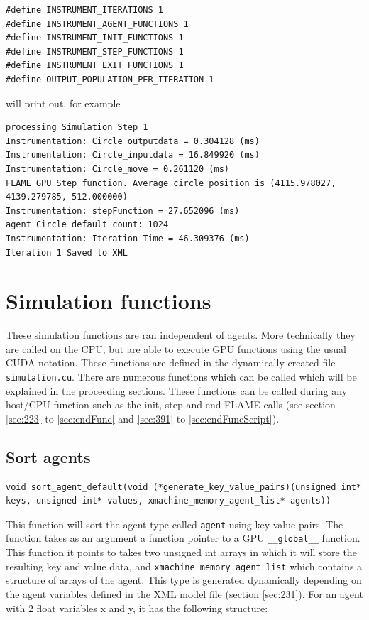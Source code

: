 \documentclass[11pt, a4paper, onecolumn, oneside]{report}
\begin{document}
\begin{verbatim}
#define INSTRUMENT_ITERATIONS 1
#define INSTRUMENT_AGENT_FUNCTIONS 1
#define INSTRUMENT_INIT_FUNCTIONS 1
#define INSTRUMENT_STEP_FUNCTIONS 1
#define INSTRUMENT_EXIT_FUNCTIONS 1
#define OUTPUT_POPULATION_PER_ITERATION 1
\end{verbatim}

will print out, for example
\begin{verbatim}
processing Simulation Step 1
Instrumentation: Circle_outputdata = 0.304128 (ms)
Instrumentation: Circle_inputdata = 16.849920 (ms)
Instrumentation: Circle_move = 0.261120 (ms)
FLAME GPU Step function. Average circle position is (4115.978027, 4139.279785, 512.000000)
Instrumentation: stepFunction = 27.652096 (ms)
agent_Circle_default_count: 1024
Instrumentation: Iteration Time = 46.309376 (ms)
Iteration 1 Saved to XML
\end{verbatim}

\section{Simulation functions}

These simulation functions are ran independent of agents. More technically they are called on the CPU, but are able to execute GPU functions using the usual CUDA notation. These functions are defined in the dynamically created file \texttt{simulation.cu}. There are numerous functions which can be called which will be explained in the proceeding sections. These functions can be called during any host/CPU function such as the init, step and end FLAME calls (see section \ref{sec:223} to \ref{sec:endFunc} and \ref{sec:391} to \ref{sec:endFuncScript}).

\subsection{Sort agents}

\begin{verbatim}
void sort_agent_default(void (*generate_key_value_pairs)(unsigned int* keys, unsigned int* values, xmachine_memory_agent_list* agents))
\end{verbatim}

This function will sort the agent type called \texttt{agent} using key-value pairs. The function takes as an argument a function pointer to a GPU \texttt{__global__} function. This function it points to takes two unsigned int arrays in which it will store the resulting key and value data, and \texttt{xmachine_memory_agent_list} which contains a structure of arrays of the agent. This type is generated dynamically depending on the agent variables defined in the XML model file (section \ref{sec:231}). For an agent with 2 float variables x and y, it has the following structure:
\end{document}
